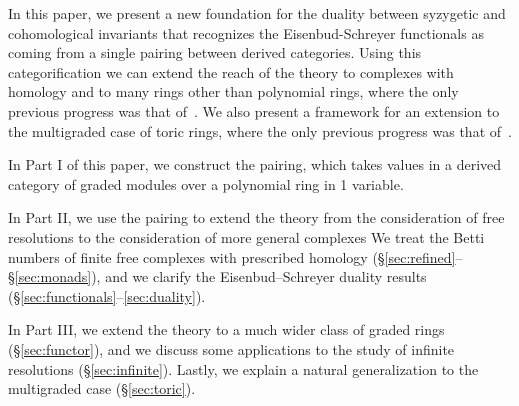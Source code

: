 \documentclass[12pt]{amsart}
\theoremstyle{definition}
\theoremstyle{remark}
\newcommand{\daniel}[1]{{\color{green} \sf $\clubsuit\clubsuit\clubsuit$ Daniel: [#1]}}
\def\BS{Boij--S\"oderberg~}
\begin{document}
In this paper, we present a new foundation for the duality between syzygetic and cohomological invariants that recognizes the Eisenbud-Schreyer functionals as coming
from a single pairing between derived categories.
Using this categorification we can  extend the reach of the theory to complexes with homology and to many rings other than polynomial rings, where the only previous progress was that of~\cite{bbeg}. We also present a framework for an extension to the multigraded case of toric rings, where the only previous progress was that of~\cites{boij-floystad,floystad-multigraded}.




In Part I of this paper, 
we construct the pairing, which takes values in a derived category of graded modules over a polynomial ring in 1 variable.


In Part II, we use the pairing to extend the theory from the consideration of free resolutions to the consideration of more general complexes
We treat the Betti numbers of finite free complexes with prescribed homology  (\S\ref{sec:refined}--\S\ref{sec:monads}), and we clarify the Eisenbud--Schreyer duality results (\S\ref{sec:functionals}--\ref{sec:duality}).  

In Part III, we extend the theory to a much wider class of graded rings (\S\ref{sec:functor}), and we discuss some applications to the study of infinite resolutions (\S\ref{sec:infinite}).  Lastly, we explain a natural generalization to the multigraded case (\S\ref{sec:toric}).

\end{document}
